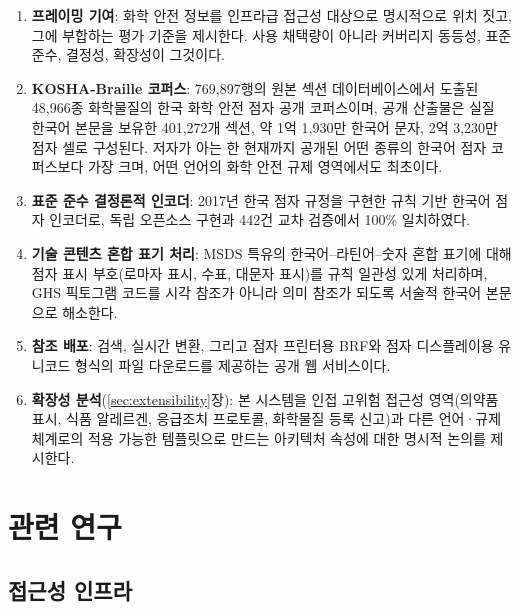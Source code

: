\documentclass[journal]{IEEEtran}
\begin{document}
\begin{enumerate}
\item \textbf{프레이밍 기여}: 화학 안전 정보를 인프라급 접근성 대상으로 명시적으로 위치 짓고, 그에 부합하는 평가 기준을 제시한다. 사용 채택량이 아니라 커버리지 동등성, 표준 준수, 결정성, 확장성이 그것이다.

\item \textbf{KOSHA-Braille 코퍼스}: 769{,}897행의 원본 섹션 데이터베이스에서 도출된 48{,}966종 화학물질의 한국 화학 안전 점자 공개 코퍼스이며, 공개 산출물은 실질 한국어 본문을 보유한 401{,}272개 섹션, 약 1억 1{,}930만 한국어 문자, 2억 3{,}230만 점자 셀로 구성된다. 저자가 아는 한 현재까지 공개된 어떤 종류의 한국어 점자 코퍼스보다 가장 크며, 어떤 언어의 화학 안전 규제 영역에서도 최초이다.

\item \textbf{표준 준수 결정론적 인코더}: 2017년 한국 점자 규정을 구현한 규칙 기반 한국어 점자 인코더로, 독립 오픈소스 구현과 442건 교차 검증에서 100\% 일치하였다.

\item \textbf{기술 콘텐츠 혼합 표기 처리}: MSDS 특유의 한국어--라틴어--숫자 혼합 표기에 대해 점자 표시 부호(로마자 표시, 수표, 대문자 표시)를 규칙 일관성 있게 처리하며, GHS 픽토그램 코드를 시각 참조가 아니라 의미 참조가 되도록 서술적 한국어 본문으로 해소한다.

\item \textbf{참조 배포}: 검색, 실시간 변환, 그리고 점자 프린터용 BRF와 점자 디스플레이용 유니코드 형식의 파일 다운로드를 제공하는 공개 웹 서비스이다.

\item \textbf{확장성 분석}(\ref{sec:extensibility}장): 본 시스템을 인접 고위험 접근성 영역(의약품 표시, 식품 알레르겐, 응급조치 프로토콜, 화학물질 등록 신고)과 다른 언어·규제 체계로의 적용 가능한 템플릿으로 만드는 아키텍처 속성에 대한 명시적 논의를 제시한다.
\end{enumerate}

\section{관련 연구}
\label{sec:related}

\subsection{접근성 인프라}
\end{document}
